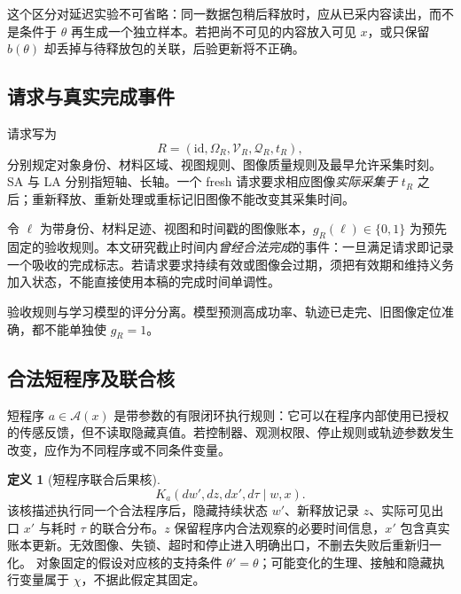 \documentclass[11pt,a4paper,fontset=fandol]{ctexart}
\theoremstyle{definition}
\newtheorem{definition}[theorem]{定义}
\theoremstyle{remark}
\numberwithin{equation}{section}
\newcommand{\cA}{\mathcal A}
\begin{document}
这个区分对延迟实验不可省略：同一数据包稍后释放时，应从已采内容读出，而不是条件于 $\theta$ 再生成一个独立样本。若把尚不可见的内容放入可见 $x$，或只保留 $b(\theta)$ 却丢掉与待释放包的关联，后验更新将不正确。

\subsection{请求与真实完成事件}
请求写为
\begin{equation}
 R=(\mathrm{id},\Omega_R,\mathcal V_R,\mathcal Q_R,t_R),
 \label{eq:request}
\end{equation}
分别规定对象身份、材料区域、视图规则、图像质量规则及最早允许采集时刻。SA 与 LA 分别指短轴、长轴。一个 fresh 请求要求相应图像\emph{实际采集于} $t_R$ 之后；重新释放、重新处理或重标记旧图像不能改变其采集时间。

令 $\ell$ 为带身份、材料足迹、视图和时间戳的图像账本，$g_R(\ell)\in\{0,1\}$ 为预先固定的验收规则。本文研究截止时间内\emph{曾经合法完成}的事件：一旦满足请求即记录一个吸收的完成标志。若请求要求持续有效或图像会过期，须把有效期和维持义务加入状态，不能直接使用本稿的完成时间单调性。

验收规则与学习模型的评分分离。模型预测高成功率、轨迹已走完、旧图像定位准确，都不能单独使 $g_R=1$。

\subsection{合法短程序及联合核}
短程序 $a\in\cA(x)$ 是带参数的有限闭环执行规则：它可以在程序内部使用已授权的传感反馈，但不读取隐藏真值。若控制器、观测权限、停止规则或轨迹参数发生改变，应作为不同程序或不同条件变量。

\begin{definition}[短程序联合后果核]
\begin{equation}
 \boxed{K_a(dw',dz,dx',d\tau\mid w,x).}
 \label{eq:kernel}
\end{equation}
该核描述执行同一个合法程序后，隐藏持续状态 $w'$、新释放记录 $z$、实际可见出口 $x'$ 与耗时 $\tau$ 的联合分布。$z$ 保留程序内合法观察的必要时间信息，$x'$ 包含真实账本更新。无效图像、失锁、超时和停止进入明确出口，不删去失败后重新归一化。
对象固定的假设对应核的支持条件 $\theta'=\theta$；可能变化的生理、接触和隐藏执行变量属于 $\chi$，不据此假定其固定。
\end{definition}
\end{document}

